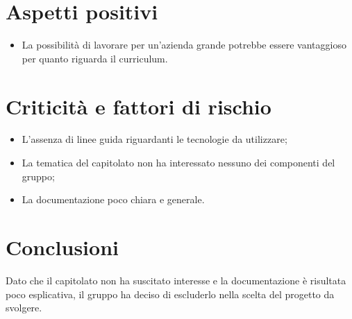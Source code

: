 \section{Aspetti positivi} \label{C5AspettiPositivi}
\begin{itemize}
	\item La possibilità di lavorare per un'azienda grande potrebbe essere vantaggioso per quanto riguarda il curriculum.
\end{itemize}
\section{Criticità e fattori di rischio} \label{C5CriticitàEFattoriDiRischio}
\begin{itemize}
	\item L'assenza di linee guida riguardanti le tecnologie da utilizzare;
	\item La tematica del capitolato non ha interessato nessuno dei componenti del gruppo;
	\item La documentazione poco chiara e generale.
\end{itemize}
\section{Conclusioni} \label{C5Conclusioni}
Dato che il capitolato non ha suscitato interesse e la documentazione è risultata poco esplicativa, il gruppo ha deciso di escluderlo nella scelta del progetto da svolgere.